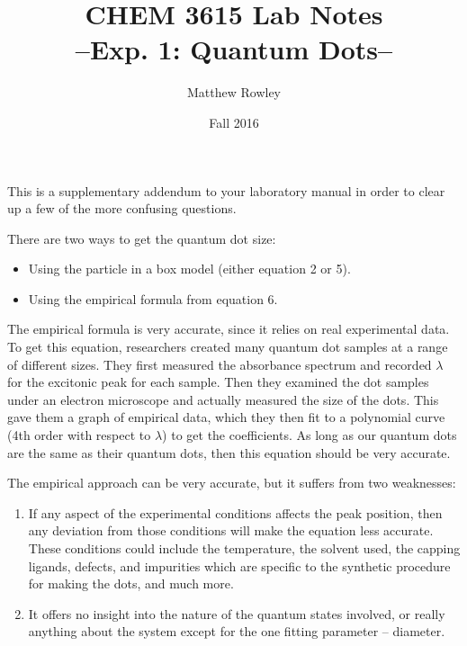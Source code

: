 \documentclass[12pt, openany, letterpaper]{memoir}
\begin{document}
\title{CHEM 3615 Lab Notes\\--Exp. 1: Quantum Dots--}
\author{Matthew Rowley}
\date{Fall 2016}
\mainmatter
\maketitle

This is a supplementary addendum to your laboratory manual in order to clear up a few of the more confusing questions.

There are two ways to get the quantum dot size:
\begin{itemize}
	\item Using the particle in a box model (either equation 2 or 5).
	\item Using the empirical formula from equation 6.
\end{itemize}

The empirical formula is very accurate, since it relies on real experimental data. To get this equation, researchers created many quantum dot samples at a range of different sizes. They first measured the absorbance spectrum and recorded $\lambda$ for the excitonic peak for each sample. Then they examined the dot samples under an electron microscope and actually measured the size of the dots. This gave them a graph of empirical data, which they then fit to a polynomial curve (4th order with respect to $\lambda$) to get the coefficients. As long as our  quantum dots are the same as their  quantum dots, then this equation should be very accurate.

The empirical approach can be very accurate, but it suffers from two weaknesses:
\begin{enumerate}
	\item If any aspect of the experimental conditions affects the peak position, then any deviation from those conditions will make the equation less accurate. These conditions could include the temperature, the solvent used, the capping ligands, defects, and impurities which are specific to the synthetic procedure for making the dots, and much more.
	\item It offers no insight into the nature of the quantum states involved, or really anything about the system except for the one fitting parameter -- diameter.
\end{enumerate}
\end{document}
